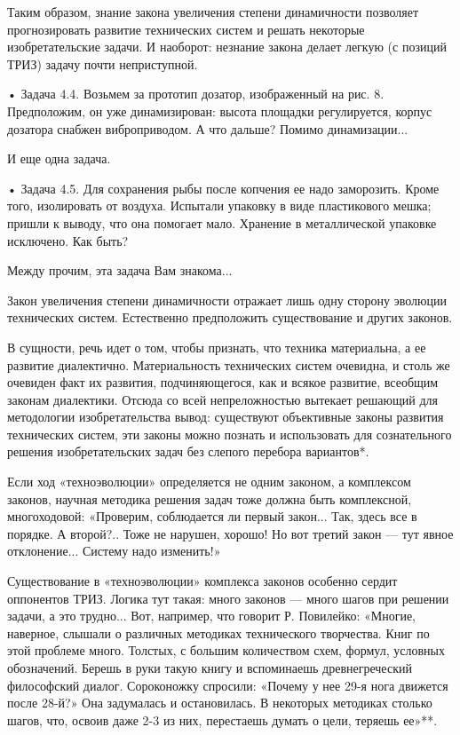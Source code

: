 Таким образом, знание закона увеличения степени динамичности позволяет
прогнозировать   развитие  технических   систем  и   решать  некоторые
изобретательские задачи. И наоборот:  незнание закона делает легкую (с
позиций ТРИЗ) задачу почти неприступной.

• Задача  4.4. Возьмем  за прототип дозатор,  изображенный на  рис. 8.
Предположим,  он  уже  динамизирован:  высота  площадки  регулируется,
корпус   дозатора  снабжен   виброприводом.  А   что  дальше?   Помимо
динамизации...


И еще одна задача.

• Задача 4.5.  Для сохранения рыбы после копчения  ее надо заморозить.
Кроме  того,   изолировать  от  воздуха.  Испытали   упаковку  в  виде
пластикового мешка; пришли к выводу, что она помогает мало. Хранение в
металлической упаковке исключено. Как быть?

Между прочим, эта задача Вам знакома...


Закон  увеличения  степени  динамичности отражает  лишь  одну  сторону
эволюции технических систем.  Естественно предположить существование и
других законов.

В сущности, речь идет о  том, чтобы признать, что техника материальна,
а ее развитие диалектично. Материальность технических систем очевидна,
и столь  же очевиден  факт их развития,  подчиняющегося, как  и всякое
развитие, всеобщим  законам диалектики. Отсюда со  всей непреложностью
вытекает решающий  для методологии изобретательства  вывод: существуют
объективные  законы  развития  технических систем,  эти  законы  можно
познать  и  использовать  для сознательного  решения  изобретательских
задач без слепого перебора вариантов*.


Если ход  «техноэволюции» определяется не одним  законом, а комплексом
законов, научная методика решения  задач тоже должна быть комплексной,
многоходовой: «Проверим, соблюдается ли первый закон... Так, здесь все
в порядке. А второй?.. Тоже не  нарушен, хорошо! Но вот третий закон —
тут явное отклонение... Систему надо изменить!»

Существование  в  «техноэволюции»  комплекса законов  особенно  сердит
оппонентов  ТРИЗ.  Логика  тут  такая: много  законов  —  много  шагов
при  решении  задачи,  а  это трудно...  Вот,  например,  что  говорит
Р.  Повилейко:  «Многие,  наверное,   слышали  о  различных  методиках
технического  творчества.  Книг по  этой  проблеме  много. Толстых,  с
большим  количеством  схем,  формул, условных  обозначений.  Берешь  в
руки  такую книгу  и вспоминаешь  древнегреческий философский  диалог.
Сороконожку спросили:  «Почему у нее  29-я нога движется  после 28-й?»
Она задумалась  и остановилась.  В некоторых методиках  столько шагов,
что, освоив даже 2-3 из них, перестаешь думать о цели, теряешь ее»**.

